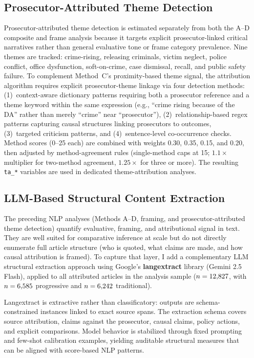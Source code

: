 \documentclass[12pt, letterpaper]{article}
\begin{document}
\subsection{Prosecutor-Attributed Theme Detection}

Prosecutor-attributed theme detection is estimated separately from both the A--D composite and frame analysis because it targets explicit prosecutor-linked critical narratives rather than general evaluative tone or frame category prevalence. Nine themes are tracked: crime-rising, releasing criminals, victim neglect, police conflict, office dysfunction, soft-on-crime, case dismissal, recall, and public safety failure. To complement Method~C's proximity-based theme signal, the attribution algorithm requires explicit prosecutor-theme linkage via four detection methods: (1)~context-aware dictionary patterns requiring both a prosecutor reference and a theme keyword within the same expression (e.g., ``crime rising because of the DA'' rather than merely ``crime'' near ``prosecutor''), (2)~relationship-based regex patterns capturing causal structures linking prosecutors to outcomes, (3)~targeted criticism patterns, and (4)~sentence-level co-occurrence checks. Method scores (0--25 each) are combined with weights 0.30, 0.35, 0.15, and 0.20, then adjusted by method-agreement rules (single-method caps at 15; $1.1\times$ multiplier for two-method agreement, $1.25\times$ for three or more). The resulting \texttt{ta\_*} variables are used in dedicated theme-attribution analyses.

\subsection{LLM-Based Structural Content Extraction}

The preceding NLP analyses (Methods A--D, framing, and prosecutor-attributed theme detection) quantify evaluative, framing, and attributional signal in text. They are well suited for comparative inference at scale but do not directly enumerate full article structure (who is quoted, what claims are made, and how causal attribution is framed). To capture that layer, I add a complementary LLM structural extraction approach using Google's \textbf{langextract} library (Gemini 2.5 Flash), applied to all attributed articles in the analysis sample ($n=12{,}827$, with $n=6{,}585$ progressive and $n=6{,}242$ traditional).

Langextract is extractive rather than classificatory: outputs are schema-constrained instances linked to exact source spans. The extraction schema covers source attribution, claims against the prosecutor, causal claims, policy actions, and explicit comparisons. Model behavior is stabilized through fixed prompting and few-shot calibration examples, yielding auditable structural measures that can be aligned with score-based NLP patterns.
\end{document}
